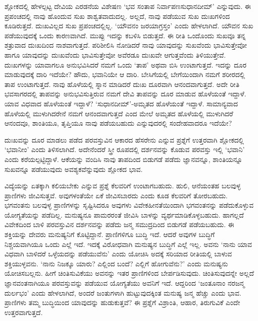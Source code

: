 ಶ್ಲೋಕದಲ್ಲಿ ಹೇಳಲ್ಪಟ್ಟ ದೇವಿಯ ಎರಡನೆಯ ವಿಶೇಷಣ `ಭವ ಸಂತಾಪ ನಿರ್ವಾಪಣಸುಧಾನದೀಮ್' ಎನ್ನುವುದು. ಈ ಪ್ರಪಂಚದಲ್ಲಿ 
ನಾವು ಹೊಂದುವ ಸುಖ ಶಾಶ್ವತವಾದುದಲ್ಲ. ಅಲ್ಲದೆ, ನಾವು ಪಡೆಯುವ ಸುಖ ದುಃಖಗಳಿಂದ ಕೂಡಿರುತ್ತದೆ. ದುಃಖವಿಲ್ಲದ 
ಸುಖ ಪ್ರಪಂಚದಲ್ಲಿಲ್ಲ. `ಯೌವನಂ ಜರಯಾಗ್ರಸ್ತಂ' ಎಂದು ಹೇಳಲಾಗಿದೆ. ಯೌವನ ಸುಖ ಪಡೆಯುವುದಕ್ಕೆ ಒಂದು 
ಕಾರಣವಾಗಿದೆ. ಮುಪ್ಪು ಇದನ್ನು ಕಬಳಿಸಿ ಬಿಡುತ್ತದೆ. ಈ ರೀತಿ ಒಂದೊಂದು ಸುಖವೂ ತನ್ನ ಶತ್ರುವಾದ ದುಃಖದಿಂದ 
ನಾಶವಾಗುತ್ತದೆ. ಪರಿಶೀಲಿಸಿ ನೋಡಿದರೆ ನಾವು ಯಾವುದನ್ನು ಸುಖವೆಂದು ಭಾವಿಸುತ್ತೇವೋ 
ಹಾಗೂ ಯಾವುದನ್ನು ದುಃಖವೆಂದು ಭಾವಿಸುತ್ತೇವೋ ಅವೆರಡೂ ದುಃಖವೇ ಆಗುತ್ತವೆಂದು ತಿಳಿಯುತ್ತೇವೆ. ದುಃಖಗಳನ್ನು 
ಯಾವಾಗಲೂ ಅನುಭವಿಸಿದರೆ ನಮಗೆ ಒಂದು `ತಾಪ' ಅಥವಾ ಬಿಸಿ ಉಂಟಾಗುತ್ತದೆ. ಇದನ್ನು ದೂರ 
ಮಾಡುವುದಕ್ಕೆ ದಾರಿ ಇದೆಯೇ? ಹೌದು, ಭವಾನಿಯೇ ಆ ದಾರಿ. ಬೇಸಿಗೆಯಲ್ಲಿ ಬೇಗೆಯಿಂದಾಗಿ 
ನಮಗೆ ಶರೀರದಲ್ಲಿ ತಾಪ ಉಂಟಾಗುತ್ತದೆ. ನಾವು ಹೊಳೆಯಲ್ಲಿ ಸ್ನಾನ ಮಾಡಿದರೆ ದುಃಖ ದೂರವಾಗಿ 
ಆನಂದವಾಗುತ್ತದೆ. ಅದೇ ರೀತಿ ಭವಸಾಗರದಲ್ಲಿ ತಾಪವನ್ನು ಅನುಭವಿಸುತ್ತಿರುವ ನಮಗೆ ದೇವಿ 
ತಾಪವನ್ನು ದೂರ ಮಾಡುವ ಹೊಳೆಯಂತೆ ಇದ್ದಾಳೆ. ಯಾವ ವಿಧವಾದ ಹೊಳೆಯಂತೆ ಇದ್ದಾಳೆ? 
`ಸುಧಾನದೀಮ್'-ಅಮೃತದ ಹೊಳೆಯಂತೆ ಇದ್ದಾಳೆ. ಸಾಮಾನ್ಯವಾದ ಹೊಳೆಯಲ್ಲಿ ಮುಳುಗಿದರೇನೆ 
ನಮಗೆ ಆನಂದವಾಗುತ್ತದೆ ಎಂದ ಮೇಲೆ ಅಮೃತದ ಹೊಳೆಯಲ್ಲಿ ಮುಳುಗಿದರೆ ಆನಂದವೂ, ಶಾಂತಿಯೂ, 
ತೃಪ್ತಿಯೂ ನಾವು ಪಡೆಯಬಹುದು ಎನ್ನುವುದರಲ್ಲಿ ಸಂದೇಹವಾದರೂ ಇದೆಯೇ?

ದುಃಖವನ್ನು ದೂರ ಮಾಡಲು ಪಡೆದ ಪರವಸ್ತುವಿನ ಆಕಾರದ ಹೆಸರೇನು ಎನ್ನುವ ಪ್ರಶ್ನೆಗೆ ಉತ್ತರವಾಗಿ ಶ್ಲೋಕದಲ್ಲಿ 
`ಭವಾನೀಂ' ಎಂದು ತಿಳಿಸಲಾಗಿದೆ. ಅದೇನೆಂದರೆ ಸ್ತ್ರೀ ರೂಪದಲ್ಲಿ ದರ್ಶನವನ್ನು ಕೊಡುವ ಪರವಸ್ತು ಇಲ್ಲಿ `ಭವಾನಿ' ಎಂದು 
ಕರೆಯಲ್ಪಟ್ಟಿದ್ದಾಳೆ. 
ಆಕೆಯನ್ನು ವಂದಿಸಿ ನಾವು ತಾಪದಿಂದ ಬಿಡುಗಡೆ ಪಡೆದು ಜ್ಞಾನವನ್ನೂ, ಶಾಂತಿಯನ್ನೂ ಸುಖವನ್ನೂ ಪಡೆಯುವುದು ಅವಶ್ಯಕವೆನ್ನುವುದು ಶ್ಲೋಕದ ಭಾವ.

ವಿದ್ಯೆಯನ್ನು ಏತಕ್ಕಾಗಿ 
ಕಲಿಯಬೇಕು ಎನ್ನುವ ಪ್ರಶ್ನೆ 
ಕೆಲವರಿಗೆ ಉಂಟಾಗಬಹುದು. ಹುಲಿ, 
ಆನೆಯಂತಹ ಬಲವುಳ್ಳ ಪ್ರಾಣಿಗಳು 
ಜೀವಿಸುತ್ತವೆ. ಅವುಗಳಂತೆಯೇ 
ಏಕೆ ಜೀವಿಸಬಾರದು ಎಂದು ಕೂಡ 
ಕೆಲವರಿಗೆ ತೋರಬಹುದು. 
ಭಗವಂತನು ಬಲವುಳ್ಳ 
ಪ್ರಾಣಿಗಳನ್ನು ಸೃಷ್ಟಿಸಿದರೂ 
ಅವುಗಳು ವಿವೇಕಹೀನತೆಯಿಂದಾಗಿ 
ಭಗವಂತನನ್ನು ಪಡೆದುಕೊಳ್ಳುವ 
ಯೋಗ್ಯತೆಯನ್ನು ಪಡೆದಿಲ್ಲ. 
ಮನುಷ್ಯನೂ ಪಾಮರರಂತೆ ಜೀವಿಸಿ 
ಬಾಳನ್ನು 
ವ್ಯರ್ಥಮಾಡಿಕೊಳ್ಳಬಹುದು. 
ಹಾಗಲ್ಲದೆ ವಿವೇಕದಿಂದ ಬಾಳಿ 
ಪರವಸ್ತುವಿನ ದರ್ಶನವನ್ನು 
ಪಡೆದು ಜನ್ಮ ಸಮುದ್ರದಿಂದ 
ಬಿಡುಗಡೆ ಪಡೆಯಬಹುದು. ಈ 
ಶಕ್ತಿಯನ್ನು ದೇವರು 
ಮನುಷ್ಯನಿಗೆ ಕೊಟ್ಟಿದ್ದಾನೆ. 
ಪ್ರಾಣಿಗಳಿಗೂ ಬುದ್ಧಿ ಇದೆ. 
ಆದರೆ ಅವುಗಳ ಬುದ್ಧಿಗೆ 
ನಿಶ್ಚಯವಾಗಿಯೂ ಒಂದು ಎಲ್ಲೆ 
ಇದೆ. ಇದಕ್ಕೆ ವಿರೋಧವಾಗಿ 
ಮನುಷ್ಯನ ಬುದ್ಧಿಗೆ ಎಲ್ಲೆ 
ಇಲ್ಲ. ಅವನು `ನಾನು ಯಾವ 
ವಿಧವಾಗಿ ಬಾಳಿದರೆ 
ಒಳ್ಳೆಯದನ್ನು ಪಡೆಯುವೆನು' 
ಎಂದು ಯೋಚಿಸಿ ಅದಕ್ಕೆ ಸರಿಯಾದ 
ರೀತಿಯಲ್ಲಿ ಬಾಳುವ 
ಶಕ್ತಿಯುಳ್ಳವನು. `ನಾನು 
ನಿಜಕ್ಕೂ ಯಾರು? ಎಲ್ಲಿಂದ ಬಂದೆ? 
ಎಲ್ಲಿಗೆ ಹೋಗುವೆನು?' ಎಂದು 
ಮನುಷ್ಯನು ಯೋಚಿಸಬಲ್ಲನು. 
ಹೀಗೆ ಚಿಂತಿಸುವಿಕೆಯು 
ಅವನನ್ನು ಇತರ ಪ್ರಾಣಿಗಳಿಂದ 
ಬೇರ್ಪಡಿಸುವುದು. 
ಚಿಂತಿಸುವುದನ್ನೇ ಅಲ್ಲದೆ 
ಜ್ಞಾನವಂತನಾಗಿಯೂ 
ಪರವಸ್ತುವನ್ನು ಪಡೆಯುವ 
ಯೋಗ್ಯತೆಯು ಅವನಿಗೆ ಇದೆ. 
ಆದ್ದರಿಂದ `ಜಂತೂನಾಂ ನರಜನ್ಮ 
ದುರ್ಲಭಂ' ಎಂದು ಹೇಳಲಾಗಿದೆ, 
ಅಂದರೆ ಜಂತುಗಳಾಗಿ 
ಹುಟ್ಟುವುದಕ್ಕಿಂತ ಮನುಷ್ಯ 
ಜನ್ಮ ಹೆಚ್ಚು ಎಂದು ಭಾವ. 
ಪ್ರಾಣಿಗಳು ತಮ್ಮ ಬುದ್ಧಿಯಿಂದ 
ಯಾವುದನ್ನು ಹುಡುಕುತ್ತವೆ? ಈ 
ಪ್ರಶ್ನೆಗೆ ವಿಶ್ರಾಂತಿ, ಆಹಾರ, ತಿರುಗುವಿಕೆ ಎಂದೇ ಉತ್ತರವಾಗುತ್ತದೆ.

